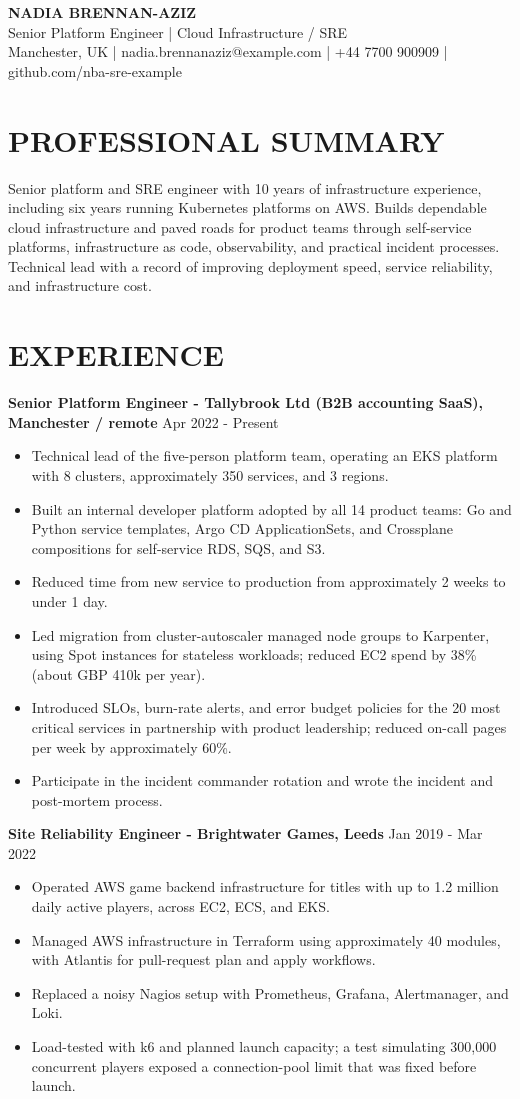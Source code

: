 \documentclass[11pt,a4paper]{article}
\newcommand{\cvsection}[1]{\section*{#1}}
\begin{document}
\begin{center}
{\Huge\bfseries\color{primarycolor} NADIA BRENNAN-AZIZ}\\[0.35em]
{\large\color{accentcolor} Senior Platform Engineer | Cloud Infrastructure / SRE}\\[0.25em]
Manchester, UK | nadia.brennanaziz@example.com | +44 7700 900909 | github.com/nba-sre-example
\end{center}

\cvsection{PROFESSIONAL SUMMARY}
Senior platform and SRE engineer with 10 years of infrastructure experience, including six years running Kubernetes platforms on AWS. Builds dependable cloud infrastructure and paved roads for product teams through self-service platforms, infrastructure as code, observability, and practical incident processes. Technical lead with a record of improving deployment speed, service reliability, and infrastructure cost.

\cvsection{EXPERIENCE}
\textbf{Senior Platform Engineer - Tallybrook Ltd (B2B accounting SaaS), Manchester / remote} \hfill Apr 2022 - Present
\begin{itemize}
\item Technical lead of the five-person platform team, operating an EKS platform with 8 clusters, approximately 350 services, and 3 regions.
\item Built an internal developer platform adopted by all 14 product teams: Go and Python service templates, Argo CD ApplicationSets, and Crossplane compositions for self-service RDS, SQS, and S3.
\item Reduced time from new service to production from approximately 2 weeks to under 1 day.
\item Led migration from cluster-autoscaler managed node groups to Karpenter, using Spot instances for stateless workloads; reduced EC2 spend by 38\% (about GBP 410k per year).
\item Introduced SLOs, burn-rate alerts, and error budget policies for the 20 most critical services in partnership with product leadership; reduced on-call pages per week by approximately 60\%.
\item Participate in the incident commander rotation and wrote the incident and post-mortem process.
\end{itemize}

\textbf{Site Reliability Engineer - Brightwater Games, Leeds} \hfill Jan 2019 - Mar 2022
\begin{itemize}
\item Operated AWS game backend infrastructure for titles with up to 1.2 million daily active players, across EC2, ECS, and EKS.
\item Managed AWS infrastructure in Terraform using approximately 40 modules, with Atlantis for pull-request plan and apply workflows.
\item Replaced a noisy Nagios setup with Prometheus, Grafana, Alertmanager, and Loki.
\item Load-tested with k6 and planned launch capacity; a test simulating 300,000 concurrent players exposed a connection-pool limit that was fixed before launch.
\end{itemize}
\end{document}
